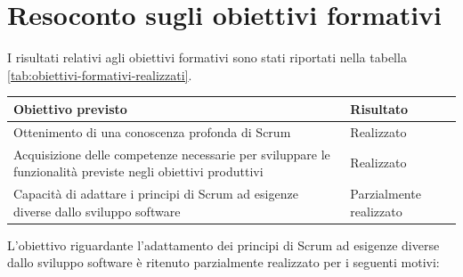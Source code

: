 \section{Resoconto sugli obiettivi formativi}

I risultati relativi agli obiettivi formativi sono stati riportati nella
tabella \ref{tab:obiettivi-formativi-realizzati}. \\

{
\centering
\begin{tabular}{| p{6cm} | p{6cm} |}

\hline
\textbf{Obiettivo previsto} & \textbf{Risultato} \\
\hline
Ottenimento di una conoscenza profonda di Scrum &
Realizzato \\
\hline
Acquisizione delle competenze necessarie per sviluppare le funzionalità
  previste negli obiettivi produttivi &
Realizzato \\
\hline
Capacità di adattare i principi di Scrum ad esigenze diverse dallo sviluppo
  software &
Parzialmente realizzato \\
\hline
\end{tabular}
\label{tab:obiettivi-formativi-realizzati}
}
\rule{0pt}{2ex}

L'obiettivo riguardante l'adattamento dei principi di Scrum ad esigenze diverse
dallo sviluppo software è ritenuto parzialmente realizzato per i seguenti
motivi:

